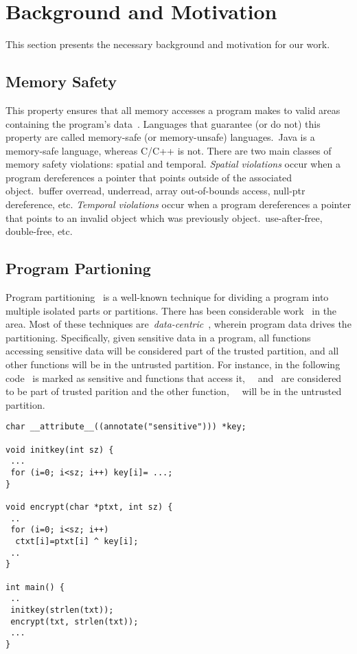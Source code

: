 \section{Background and Motivation}
This section presents the necessary background and motivation for our work.

\subsection{Memory Safety}
This property ensures that all memory accesses a program makes to valid areas containing the program's data~\cite{payer2019software}.
Languages that guarantee (or do not) this property are called memory-safe (or memory-unsafe) languages.~\eg Java is a memory-safe language, whereas C/C++ is not.
There are two main classes of memory safety violations: spatial and temporal.
\emph{Spatial violations} occur when a program dereferences a pointer that points outside of the associated object.~\eg buffer overread, underread, array out-of-bounds access, null-ptr dereference, etc.
\emph{Temporal violations} occur when a program dereferences a pointer that points to an invalid object which was previously object.~\eg use-after-free, double-free, etc.

\subsection{Program Partioning}
\label{subsec:background:programpart}
Program partitioning~\cite{rul2009towards} is a well-known technique for dividing a program into multiple isolated parts or partitions.
There has been considerable work~\cite{tan2017principles, brumley2004privtrans, bittau2008wedge, lind2017glamdring, liu2017ptrsplit} in the area.
Most of these techniques are~\emph{data-centric}~\cite{lind2017glamdring, liu2017ptrsplit}, wherein program data drives the partitioning.
Specifically, given sensitive data in a program, all functions accessing sensitive data will be considered part of the trusted partition, and all other functions will be in the untrusted partition.
For instance, in the following code~ is marked as sensitive and functions that access it,~\ie{}~ and~ are considered to be part of trusted parition and the other function,~\ie{}~ will be in the untrusted partition.
\begin{verbatim}
char __attribute__((annotate("sensitive"))) *key;

void initkey(int sz) {
 ...
 for (i=0; i<sz; i++) key[i]= ...;
}

void encrypt(char *ptxt, int sz) {
 ..
 for (i=0; i<sz; i++)
  ctxt[i]=ptxt[i] ^ key[i];
 ..
}

int main() {
 ..
 initkey(strlen(txt));
 encrypt(txt, strlen(txt));
 ... 
}
\end{verbatim}

